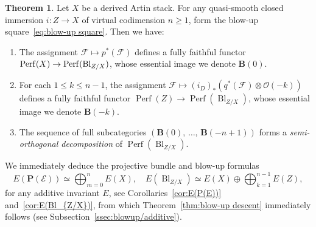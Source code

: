 \documentclass[11pt]{article}
\theoremstyle{definition}
\numberwithin{equation}{section}
\numberwithin{figure}{section}
\numberwithin{table}{section}
\newtheorem{thmX}{Theorem}
\newcommand{\sE}{\ensuremath{\mathcal{E}}\xspace}
\newcommand{\sF}{\ensuremath{\mathcal{F}}\xspace}
\newcommand{\sO}{\ensuremath{\mathcal{O}}\xspace}
\newcommand{\bB}{\ensuremath{\mathbf{B}}\xspace}
\newcommand{\bP}{\ensuremath{\mathbf{P}}\xspace}
\renewcommand{\ge}{\geqslant}
\renewcommand{\le}{\leqslant}
\renewcommand{\P}{\bP}
\DeclareMathOperator{\Perf}{Perf}
\DeclareMathOperator{\Bl}{Bl}
\newcommand*{\romanenumi}{\renewcommand*{\theenumi}{\roman{enumi}}}
\begin{document}
\begin{thmX}\label{thm:Perf(Bl)}
Let $X$ be a derived Artin stack. For any quasi-smooth closed immersion $i : Z \to X$ of virtual codimension $n\ge 1$, form the blow-up square~\eqref{eq:blow-up square}. Then we have:
\begin{enumerate}\romanenumi
\item\label{item:Perf(Bl)/fully faithful 1}
The assignment $\sF \mapsto p^*(\sF)$ defines a fully faithful functor $\Perf(X) \linebreak\to \Perf(\Bl_{Z/X})$, whose essential image we denote $\bB(0)$.

\item\label{item:Perf(Bl)/fully faithful 2}
For each $1\le k\le n-1$, the assignment $\sF \mapsto (i_D)_*(q^*(\sF) \otimes \sO(-k))$ defines a fully faithful functor $\Perf(Z) \to \Perf(\Bl_{Z/X})$, whose essential image we denote $\bB(-k)$.

\item\label{item:Perf(Bl)/SOD}
The sequence of full subcategories $(\bB(0),\,\ldots,\,\bB(-n+1))$ forms a \emph{semi-orthogonal decomposition} of $\Perf(\Bl_{Z/X})$.
\end{enumerate}
\end{thmX}

We immediately deduce the projective bundle and blow-up formulas
\[
E(\P(\sE)) \simeq \bigoplus_{m=0}^{n} E(X),
\quad E\left(\Bl_{Z/X}\right) \simeq E(X) \oplus \bigoplus_{k=1}^{n-1} E(Z),
\]
for any additive invariant $E$, see Corollaries~\ref{cor:E(P(E))} and~\ref{cor:E(Bl_{Z/X})}, from which Theorem~\ref{thm:blow-up descent} immediately follows (see Subsection~\ref{ssec:blowup/additive}).
\end{document}
